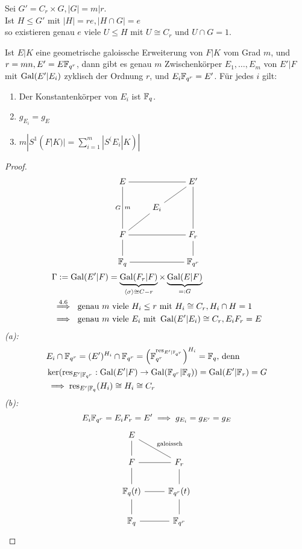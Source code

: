 \begin{lemma}
    Sei $G' = C_r \times G, |G| = m| r$.\\
    Ist $H \leq G'$ mit $|H| = re, |H \cap G| = e$ \\
    so existieren genau $e$ viele $U \leq H$ mit $U \cong C_r$ und $U\cap G=1$. 
\end{lemma}

\begin{satz}
    Ist $E|K$ eine geometrische galoissche Erweiterung von $F|K$ vom Grad $m$, und $r = mn, E' = E\mathbb{F}_{q^r}$,
    dann gibt es genau $m$ Zwischenkörper $E_1, \ldots, E_m$ von $E'|F$ mit $\operatorname{Gal}(E'|E_i)$ zyklisch der Ordnung $r$, und
    $E_i\mathbb{F}_{q^r} = E'$.
    Für jedes $i$ gilt:
    \begin{enumerate}[label=(\alph*)]
        \item Der Konstantenkörper von $E_i$ ist $\mathbb{F}_q$.
        \item $g_{E_i}=g_E$
        \item $m |S^1(F|K)| = \sum\limits_{i=1}^m |S^(E_i|K)|$
    \end{enumerate}
\end{satz}
\begin{proof}
    $$\begin{tikzcd}[cramped]
        E \ar[rr, dash]{C_r} \ar[dd, dash, "G"', "m"] & & E' \ar[dd, dash]{G}\\
        & E_i \ar[ur, dash]{H_i} &\\
        F \ar[ur, dash] \ar[rr, dash]{C_r} \dar[dash]& & F_r \dar[dash] \\
        \F_q \ar[rr, dash]{C_r}& & \F_{q^r}
    \end{tikzcd}$$
    \begin{align*}
        &\Gamma := \operatorname{Gal}(E'|F) = \underbrace{\operatorname{Gal}(F_r|F)}_{\langle\sigma\rangle \cong C-r} \times \underbrace{\operatorname{Gal}(E|F)}_{=:G}\\
        &\stackrel{4.6}{\implies}\text{ genau $m$ viele } H_i \leq r \text{ mit } H_i \cong C_r, H_i \cap H = 1\\
        & \implies \text{ genau $m$ viele } E_i \text{ mit } \operatorname{Gal}(E'|E_i) \cong C_r, E_iF_r =E
    \end{align*}
    \emph{(a):}
    \begin{align*}
        &E_i \cap \mathbb{F}_{q^r} = (E')^{H_i} \cap \mathbb{F}_{q^r} = \left(\mathbb{F}_{q^r}^{\operatorname{res}_{E'|\mathbb{F}_{q^r}}}\right)^{H_i} = \mathbb{F}_q \text{, denn}\\
        &\ker (\operatorname{res}_{E'|\mathbb{F}_{q^r}}: \operatorname{Gal}(E'|F) \to \operatorname{Gal}(\mathbb{F}_{q^r}|\mathbb{F}_q)) = \operatorname{Gal}(E'|\mathbb{F}_r) = G \\
        &\implies \operatorname{res}_{E'|\mathbb{F}_{q}}(H_i) \cong H_i \cong C_r
    \end{align*}
    \emph{(b):} $$ E_i\mathbb{F}_{q^r} = E_iF_r = E' \implies g_{E_i}=g_{E'}=g_E$$
    $$\begin{tikzcd}
        E \dar[dash] \drar[dash]{\text{galoissch}}\\
        F \dar[dash] \rar[dash]& F_r \dar[dash]\\
        \F_q(t) \dar[dash] \rar[dash]& \F_{q^r}(t)\dar[dash] \\
        \F_q \rar[dash]& \F_{q^r}
    \end{tikzcd}$$
\end{proof}

